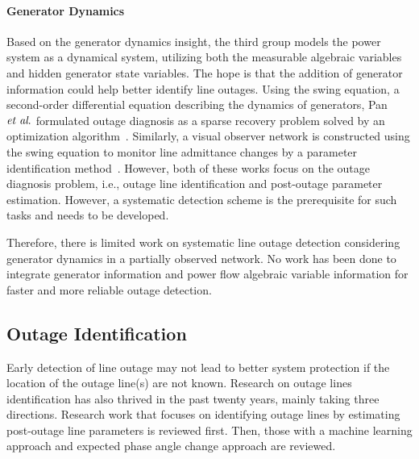 \paragraph{Generator Dynamics}
Based on the generator dynamics insight, the third group models the power system as a dynamical system, utilizing both the measurable algebraic variables and hidden generator state variables. The hope is that the addition of generator information could help better identify line outages. Using the swing equation, a second-order differential equation describing the dynamics of generators, Pan $\textit{et al}.$ formulated outage diagnosis as a sparse recovery problem solved by an optimization algorithm~\cite{Pan2015a}. Similarly, a visual observer network is constructed using the swing equation to monitor line admittance changes by a parameter identification method~\cite{Yang2016b}. However, both of these works focus on the outage diagnosis problem, i.e., outage line identification and post-outage parameter estimation. However, a systematic detection scheme is the prerequisite for such tasks and needs to be developed.

Therefore, there is limited work on systematic line outage detection  considering generator dynamics in a partially observed network. No work has been done to integrate generator information and power flow algebraic variable information for faster and more reliable outage detection.



\subsection{Outage Identification} %
\label{sub:outage_identification}
Early detection of line outage may not lead to better system protection if the location of the outage line(s) are not known. Research on outage lines identification has also thrived in the past twenty years, mainly taking three directions. Research work that focuses on identifying outage lines by estimating post-outage line parameters is reviewed first. Then, those with a machine learning approach and expected phase angle change approach are reviewed.


